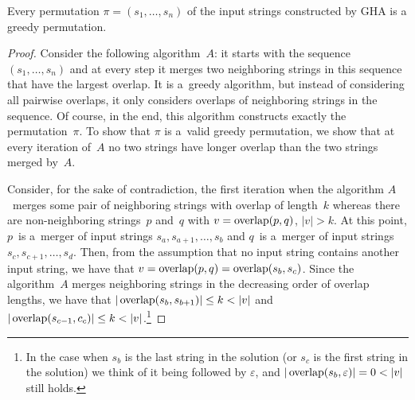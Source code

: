 \begin{theorem}
\label{thm:gr_im_wghc}
Every permutation $\pi=(s_1, \dots, s_n)$ of the input strings constructed by GHA is a greedy permutation.
\end{theorem}
\begin{proof}
Consider the following algorithm~$A$: it starts with the sequence $(s_1, \dots, s_n)$ and at every step it merges two neighboring strings in this sequence that have the largest overlap. It is a~greedy algorithm, but instead of considering all pairwise overlaps, it only considers overlaps of neighboring strings in the sequence. Of course, in the end, this algorithm constructs exactly the permutation~$\pi$. To show that $\pi$ is a~valid greedy permutation, we show that at every iteration of~$A$ no two strings have longer overlap than the two strings merged by~$A$.

Consider, for the sake of contradiction, the first iteration when the algorithm $A$~merges some pair of neighboring strings with overlap of length~$k$ whereas there are non-neighboring strings~$p$ and~$q$ with $v=\operatorname{overlap}(p,q)$, $|v|>k$. 
At this point, $p$~is a~merger of input strings $s_a, s_{a+1}, \dotsc, s_b$
and $q$~is a~merger of input strings $s_c, s_{c+1}, \dotsc, s_d$. 
Then, from the assumption that no input string contains another input string, we have that $v=\operatorname{overlap}(p,q)=\operatorname{overlap}(s_b,s_c)$. Since the algorithm~$A$
merges neighboring strings in the decreasing order of overlap lengths, we have that $|\overlap(s_b,s_{b+1})| \le k <|v|$ and $|\operatorname{overlap}(s_{c-1},c_c)| \le k < |v|$.\footnote{In the case when $s_b$ is the last string in the solution (or $s_c$ is the first string in the solution) we think of it being followed by $\varepsilon$, and $|\overlap(s_b,\varepsilon)|=0<|v|$ still holds.} 


\end{proof}

